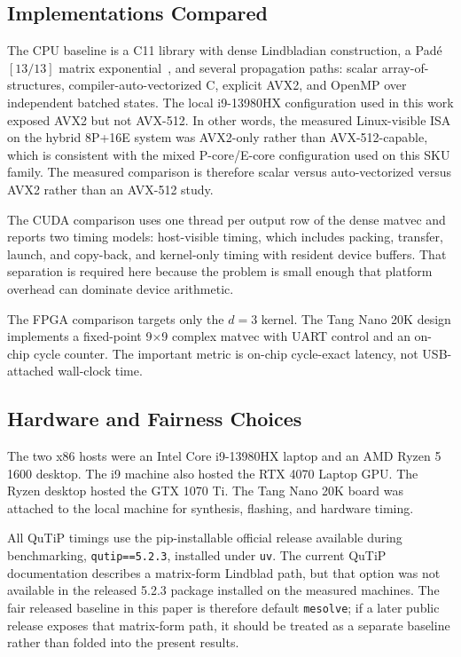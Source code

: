 \documentclass[3p,times,twocolumn]{elsarticle}
\begin{document}
\subsection{Implementations Compared}

The CPU baseline is a C11 library with dense Lindbladian construction, a
Pad\'e $[13/13]$ matrix exponential~\cite{Higham2005}, and several
propagation paths: scalar array-of-structures, compiler-auto-vectorized C,
explicit AVX2, and OpenMP over independent batched states. The local
i9-13980HX configuration used in this work exposed AVX2 but not AVX-512. In
other words, the measured Linux-visible ISA on the hybrid 8P+16E system was
AVX2-only rather than AVX-512-capable, which is consistent with the mixed
P-core/E-core configuration used on this SKU family. The measured comparison
is therefore scalar versus auto-vectorized versus AVX2 rather than an
AVX-512 study.

The CUDA comparison uses one thread per output row of the dense matvec and
reports two timing models: host-visible timing, which includes packing,
transfer, launch, and copy-back, and kernel-only timing with resident device
buffers. That separation is required here because the problem is small
enough that platform overhead can dominate device arithmetic.

The FPGA comparison targets only the $d=3$ kernel. The Tang Nano 20K design
implements a fixed-point 9$\times$9 complex matvec with UART control and an
on-chip cycle counter. The important metric is on-chip cycle-exact latency,
not USB-attached wall-clock time.

\subsection{Hardware and Fairness Choices}

The two x86 hosts were an Intel Core i9-13980HX laptop and an AMD Ryzen 5
1600 desktop. The i9 machine also hosted the RTX 4070 Laptop GPU. The Ryzen
desktop hosted the GTX 1070 Ti. The Tang Nano 20K board was attached to the
local machine for synthesis, flashing, and hardware timing.

All QuTiP timings use the pip-installable official release available during
benchmarking, \texttt{qutip==5.2.3}, installed under \texttt{uv}. The
current QuTiP documentation describes a matrix-form Lindblad path, but that
option was not available in the released 5.2.3 package installed on the
measured machines. The fair released baseline in this paper is therefore
default \texttt{mesolve}; if a later public release exposes that matrix-form
path, it should be treated as a separate baseline rather than folded into
the present results.
\end{document}

